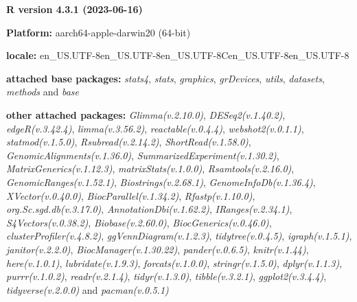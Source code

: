 \documentclass[
]{book}
\begin{document}
\textbf{R version 4.3.1 (2023-06-16)}

\textbf{Platform:} aarch64-apple-darwin20 (64-bit)

\textbf{locale:}
en\_US.UTF-8\textbar\textbar en\_US.UTF-8\textbar\textbar en\_US.UTF-8\textbar\textbar C\textbar\textbar en\_US.UTF-8\textbar\textbar en\_US.UTF-8

\textbf{attached base packages:}
\emph{stats4}, \emph{stats}, \emph{graphics}, \emph{grDevices}, \emph{utils}, \emph{datasets}, \emph{methods} and \emph{base}

\textbf{other attached packages:}
\emph{Glimma(v.2.10.0)}, \emph{DESeq2(v.1.40.2)}, \emph{edgeR(v.3.42.4)}, \emph{limma(v.3.56.2)}, \emph{reactable(v.0.4.4)}, \emph{webshot2(v.0.1.1)}, \emph{statmod(v.1.5.0)}, \emph{Rsubread(v.2.14.2)}, \emph{ShortRead(v.1.58.0)}, \emph{GenomicAlignments(v.1.36.0)}, \emph{SummarizedExperiment(v.1.30.2)}, \emph{MatrixGenerics(v.1.12.3)}, \emph{matrixStats(v.1.0.0)}, \emph{Rsamtools(v.2.16.0)}, \emph{GenomicRanges(v.1.52.1)}, \emph{Biostrings(v.2.68.1)}, \emph{GenomeInfoDb(v.1.36.4)}, \emph{XVector(v.0.40.0)}, \emph{BiocParallel(v.1.34.2)}, \emph{Rfastp(v.1.10.0)}, \emph{org.Sc.sgd.db(v.3.17.0)}, \emph{AnnotationDbi(v.1.62.2)}, \emph{IRanges(v.2.34.1)}, \emph{S4Vectors(v.0.38.2)}, \emph{Biobase(v.2.60.0)}, \emph{BiocGenerics(v.0.46.0)}, \emph{clusterProfiler(v.4.8.2)}, \emph{ggVennDiagram(v.1.2.3)}, \emph{tidytree(v.0.4.5)}, \emph{igraph(v.1.5.1)}, \emph{janitor(v.2.2.0)}, \emph{BiocManager(v.1.30.22)}, \emph{pander(v.0.6.5)}, \emph{knitr(v.1.44)}, \emph{here(v.1.0.1)}, \emph{lubridate(v.1.9.3)}, \emph{forcats(v.1.0.0)}, \emph{stringr(v.1.5.0)}, \emph{dplyr(v.1.1.3)}, \emph{purrr(v.1.0.2)}, \emph{readr(v.2.1.4)}, \emph{tidyr(v.1.3.0)}, \emph{tibble(v.3.2.1)}, \emph{ggplot2(v.3.4.4)}, \emph{tidyverse(v.2.0.0)} and \emph{pacman(v.0.5.1)}
\end{document}
